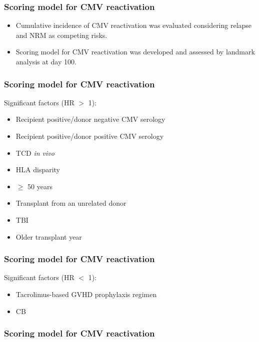 \documentclass[14pt]{beamer}
\begin{document}
	\begin{frame}
	\frametitle{Scoring model for CMV reactivation}
	\begin{itemize}
	\item Cumulative incidence of CMV reactivation was evaluated considering relapse and NRM as competing risks.
	\item Scoring model for CMV reactivation was developed and assessed by landmark analysis at day 100.

	\end{itemize}
	\end{frame}

	\begin{frame}
	\frametitle{Scoring model for CMV reactivation}
	Significant factors (HR $>$ 1):
	\begin{itemize}
	\item Recipient positive/donor negative CMV serology
	\item Recipient positive/donor positive CMV serology
	\item TCD {\it in vivo}
	\item HLA disparity
	\item $\geq$ 50 years
	\item Transplant from an unrelated donor
	\item TBI
	\item Older transplant year

	\end{itemize}
	\end{frame}

	\begin{frame}
	\frametitle{Scoring model for CMV reactivation}
	Significant factors (HR $<$ 1):
	\begin{itemize}
	\item Tacrolimus-based GVHD prophylaxis regimen
	\item CB

	\end{itemize}
	\end{frame}

	\begin{frame}
	\frametitle{Scoring model for CMV reactivation}
	\end{frame}
\end{document}

